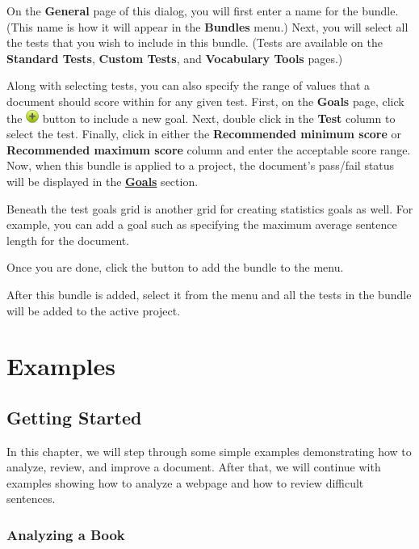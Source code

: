 \documentclass[
]{book}
\theoremstyle{definition}
\theoremstyle{definition}
\theoremstyle{definition}
\theoremstyle{definition}
\theoremstyle{remark}
\begin{document}
On the \textbf{General} page of this dialog, you will first enter a name for the bundle. (This name is how it will appear in the \textbf{Bundles} menu.) Next, you will select all the tests that you wish to include in this bundle. (Tests are available on the \textbf{Standard Tests}, \textbf{Custom Tests}, and \textbf{Vocabulary Tools} pages.)

Along with selecting tests, you can also specify the range of values that a document should score within for any given test. First, on the \textbf{Goals} page, click the \includegraphics{Images/NonGenerated/add.png} button to include a new goal. Next, double click in the \textbf{Test} column to select the test. Finally, click in either the \textbf{Recommended minimum score} or \textbf{Recommended maximum score} column and enter the acceptable score range. Now, when this bundle is applied to a project, the document's pass/fail status will be displayed in the \protect\hyperlink{reviewing-goals}{\textbf{Goals}} section.

Beneath the test goals grid is another grid for creating statistics goals as well. For example, you can add a goal such as specifying the maximum average sentence length for the document.

Once you are done, click the  button to add the bundle to the menu.

After this bundle is added, select it from the menu and all the tests in the bundle will be added to the active project.

\hypertarget{part-examples}{%
\part{Examples}\label{part-examples}}

\hypertarget{getting-started}{%
\chapter{Getting Started}\label{getting-started}}

In this chapter, we will step through some simple examples demonstrating how to analyze, review, and improve a document. After that, we will continue with examples showing how to analyze a webpage and how to review difficult sentences.

\hypertarget{book-example}{%
\section{Analyzing a Book}\label{book-example}}
\end{document}
